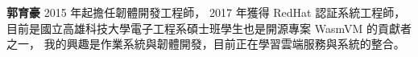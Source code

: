 \vspace{1cm}
\begin{flushleft}
\centering
\begin{minipage}{.15\textwidth}
\end{minipage}
\hspace{1cm}
\begin{minipage}{.75\textwidth}
\textbf{郭育豪} 2015 年起擔任韌體開發工程師，
2017 年獲得 RedHat 認証系統工程師，
目前是國立高雄科技大學電子工程系碩士班學生也是開源專案 WasmVM 的貢獻者之一，
我的興趣是作業系統與韌體開發，目前正在學習雲端服務與系統的整合。
\end{minipage}
\end{flushleft} 
